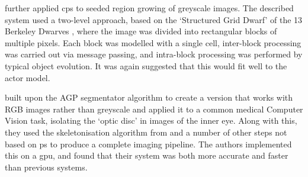 \citeauthor{Nicolescu2015} \cite{Nicolescu2015} further applied \gls{cps} to seeded region growing of greyscale images.  The described system used a two-level approach, based on the `Structured Grid Dwarf' of the 13 Berkeley Dwarves \cite{Asanovic2006}, where the image was divided into rectangular blocks of multiple pixels.  Each block was modelled with a single cell, inter-block processing was carried out via message passing, and intra-block processing was performed by typical object evolution.  It was again suggested that this would fit well to the \Gls{actor} model.

\citeauthor{Diaz-Pernil2016} \cite{Diaz-Pernil2016} built upon the AGP segmentator algorithm to create a version that works with RGB images rather than greyscale and applied it to a common medical Computer Vision task, isolating the `optic disc' in images of the inner eye.  Along with this, they used the skeletonisation algorithm from \cite{Diaz-Pernil2013a} and a number of other steps not based on \gls{ps} to produce a complete imaging pipeline.  The authors implemented this on a \gls{gpu}, and found that their system was both more accurate and faster than previous systems.


